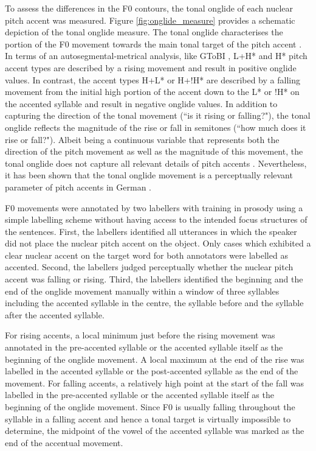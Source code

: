 To assess the differences in the F0 contours, the tonal onglide of each nuclear pitch accent was measured. Figure \ref{fig:onglide_measure} provides a schematic depiction of the tonal onglide measure. The tonal onglide characterises the portion of the F0 movement towards the main tonal target of the pitch accent \citep{RitterGrice2015}. In terms of an autosegmental-metrical analysis, like GToBI \citep{GriceBaumannBenzmüller2005}, L+H* and H* pitch accent types are described by a rising movement and result in positive onglide values. In contrast, the accent types H+L* or H+!H* are described by a falling movement from the initial high portion of the accent down to the L* or !H* on the accented syllable and result in negative onglide values. In addition to capturing the direction of the tonal movement (``is it rising or falling?"), the tonal onglide reflects the magnitude of the rise or fall in semitones (``how much does it rise or fall?"). Albeit being a continuous variable that represents both the direction of the pitch movement as well as the magnitude of this movement, the tonal onglide does not capture all relevant details of pitch accents \citep{Griceetal2017}. Nevertheless, it has been shown that the tonal onglide movement is a perceptually relevant parameter of pitch accents in German \citep{BaumannRöhr2015, RitterGrice2015}.

F0 movements were annotated by two labellers with training in prosody using a simple labelling scheme without having access to the intended focus structures of the sentences. First, the labellers identified all utterances in which the speaker did not place the nuclear pitch accent on the object. Only cases which exhibited a clear nuclear accent on the target word for both annotators were labelled as accented. Second, the labellers judged perceptually whether the nuclear pitch accent was falling or rising. Third, the labellers identified the beginning and the end of the onglide movement manually within a window of three syllables including the accented syllable in the centre, the syllable before and the syllable after the accented syllable.

For rising accents, a local minimum just before the rising movement was annotated in the pre-accented syllable or the accented syllable itself as the beginning of the onglide movement. A local maximum at the end of the rise was labelled in the accented syllable or the post-accented syllable as the end of the movement. For falling accents, a relatively high point at the start of the fall was labelled in the pre-accented syllable or the accented syllable itself as the beginning of the onglide movement. Since F0 is usually falling throughout the syllable in a falling accent and hence a tonal target is virtually impossible to determine, the midpoint of the vowel of the accented syllable was marked as the end of the accentual movement.

